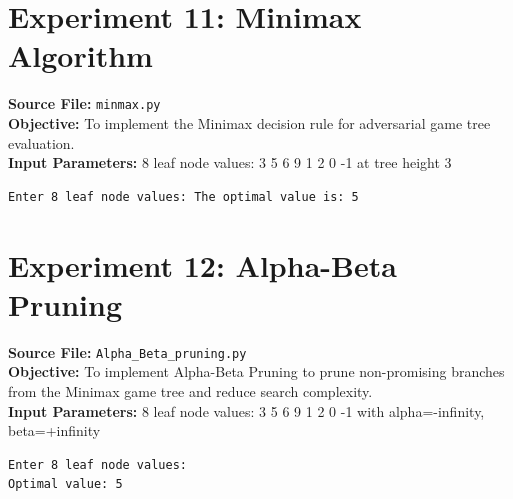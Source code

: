 \documentclass[11pt,a4paper]{article}
\begin{document}
\section{Experiment 11: Minimax Algorithm}
\textbf{Source File:} \texttt{minmax.py} \\[4pt]
\textbf{Objective:} To implement the Minimax decision rule for adversarial game tree evaluation. \\[4pt]
\textbf{Input Parameters:} 8 leaf node values: 3 5 6 9 1 2 0 -1 at tree height 3 \\[6pt]
\begin{tcolorbox}[colback=gray!5!white,colframe=blue!70!black,title={\textbf{Program Output: Minimax Algorithm}}]
\begin{verbatim}
Enter 8 leaf node values: The optimal value is: 5
\end{verbatim}
\end{tcolorbox}
\vspace{1em}

\section{Experiment 12: Alpha-Beta Pruning}
\textbf{Source File:} \texttt{Alpha_Beta_pruning.py} \\[4pt]
\textbf{Objective:} To implement Alpha-Beta Pruning to prune non-promising branches from the Minimax game tree and reduce search complexity. \\[4pt]
\textbf{Input Parameters:} 8 leaf node values: 3 5 6 9 1 2 0 -1 with alpha=-infinity, beta=+infinity \\[6pt]
\begin{tcolorbox}[colback=gray!5!white,colframe=blue!70!black,title={\textbf{Program Output: Alpha-Beta Pruning}}]
\begin{verbatim}
Enter 8 leaf node values: 
Optimal value: 5
\end{verbatim}
\end{tcolorbox}
\vspace{1em}
\end{document}
